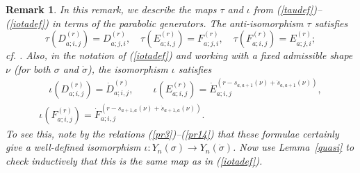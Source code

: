 \documentclass[twoside,12pt,reqno]{amsart}
\newtheorem{Remark}[Proposition]{Remark}
\begin{document}
\begin{Remark}\rm
In this remark, we describe 
the maps $\tau$ and $\iota$ from (\ref{taudef})--(\ref{iotadef}) 
in terms of the parabolic generators. 
The anti-isomorphism $\tau$ satisfies
\begin{equation}
\tau(D_{a;i,j}^{(r)}) =
D_{a;j,i}^{(r)},\quad
\tau(E_{a;i,j}^{(r)}) = 
F_{a;j,i}^{(r)},\quad
\tau(F_{a;i,j}^{(r)}) = 
E_{a;j,i}^{(r)};
\end{equation}
cf. \cite[(6.6)--(6.8)]{BK}.
Also, in the notation of (\ref{iotadef}) and working with a fixed
admissible shape $\nu$ (for both $\sigma$ and $\dot\sigma$), 
the isomorphism $\iota$ satisfies
\begin{multline}
\quad\iota(D_{a;i,j}^{(r)}) =
\dot D_{a;i,j}^{(r)},\qquad
\iota(E_{a;i,j}^{(r)}) =
\dot E_{a;i,j}^{(r-s_{a,a+1}(\nu)+\dot s_{a,a+1}(\nu))},\\
\iota(F_{a;i,j}^{(r)}) =
\dot F_{a;i,j}^{(r-s_{a+1,a}(\nu)+\dot s_{a+1,a}(\nu))}.\quad
\label{iotadefpar}
\end{multline}
To see this, note by the relations 
(\ref{pr3})--(\ref{pr14}) that these formulae
certainly give a well-defined isomorphism 
$\iota:Y_n(\sigma) \rightarrow 
Y_n(\dot\sigma)$. Now use Lemma~\ref{quasi} to check 
inductively that this is the same map as in 
(\ref{iotadef}).
\end{Remark}
\end{document}
